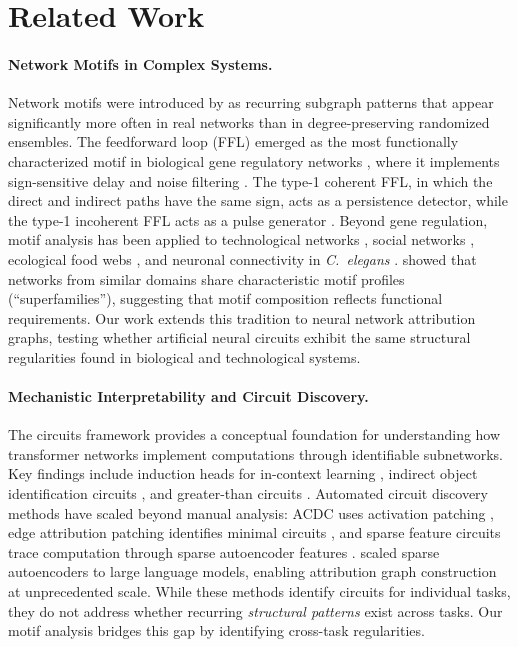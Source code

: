 \section{Related Work}\label{sec:related}

\paragraph{Network Motifs in Complex Systems.}
Network motifs were introduced by \citet{milo2002network} as recurring subgraph patterns that appear significantly more often in real networks than in degree-preserving randomized ensembles. The feedforward loop (FFL) emerged as the most functionally characterized motif in biological gene regulatory networks \cite{shenorr2002network}, where it implements sign-sensitive delay and noise filtering \cite{mangan2003structure, alon2007network}. The type-1 coherent FFL, in which the direct and indirect paths have the same sign, acts as a persistence detector, while the type-1 incoherent FFL acts as a pulse generator \cite{alon2007network}. Beyond gene regulation, motif analysis has been applied to technological networks \cite{milo2004superfamilies}, social networks \cite{leskovec2010signed}, ecological food webs \cite{stouffer2007evidence}, and neuronal connectivity in \emph{C.\ elegans} \cite{milo2002network}. \citet{milo2004superfamilies} showed that networks from similar domains share characteristic motif profiles (``superfamilies''), suggesting that motif composition reflects functional requirements. Our work extends this tradition to neural network attribution graphs, testing whether artificial neural circuits exhibit the same structural regularities found in biological and technological systems.

\paragraph{Mechanistic Interpretability and Circuit Discovery.}
The circuits framework \cite{elhage2021mathematical, olsson2022context} provides a conceptual foundation for understanding how transformer networks implement computations through identifiable subnetworks. Key findings include induction heads for in-context learning \cite{olsson2022context}, indirect object identification circuits \cite{wang2023interpretability}, and greater-than circuits \cite{hanna2023how}. Automated circuit discovery methods have scaled beyond manual analysis: ACDC uses activation patching \cite{conmy2023automated}, edge attribution patching identifies minimal circuits \cite{syed2023attribution}, and sparse feature circuits trace computation through sparse autoencoder features \cite{marks2024sparse}. \citet{templeton2024scaling} scaled sparse autoencoders to large language models, enabling attribution graph construction at unprecedented scale. While these methods identify circuits for individual tasks, they do not address whether recurring \emph{structural patterns} exist across tasks. Our motif analysis bridges this gap by identifying cross-task regularities.

